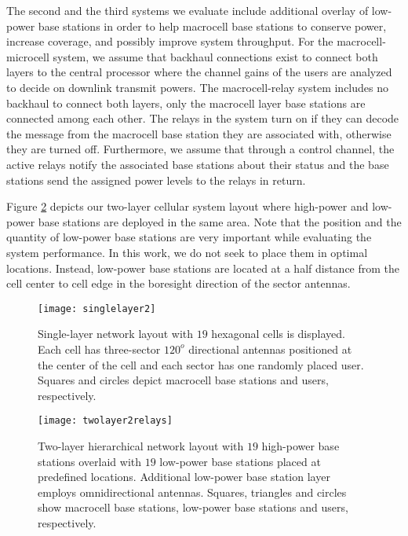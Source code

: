 \documentclass[conference,letterpaper,final,10pt]{IEEEtran}
\begin{document}
The second and the third systems we evaluate include additional overlay of low-power base stations in order to help macrocell base stations to conserve power, increase coverage, and possibly improve system throughput. For the macrocell-microcell system, we assume that backhaul connections exist to connect both layers to the central processor where the channel gains of the users are analyzed to decide on downlink transmit powers. The macrocell-relay system includes no backhaul to connect both layers, only the macrocell layer base stations are connected among each other. The relays in the system turn on if they can decode the message from the macrocell base station they are associated with, otherwise they are turned off. Furthermore, we assume that through a control channel, the active relays notify the associated base stations about their status and the base stations send the assigned power levels to the relays in return.

Figure \ref{twolayer_fig} depicts our two-layer cellular system layout where high-power and low-power base stations are deployed in the same area. Note that the position and the quantity of low-power base stations are very important while evaluating the system performance. In this work, we do not seek to place them in optimal locations. Instead, low-power base stations are located at a half distance from the cell center to cell edge in the boresight direction of the sector antennas.

\begin{figure}[tb!]\begin{center}
  \texttt{[image: singlelayer2]}\\ \caption{Single-layer network layout with $19$ hexagonal cells is displayed. Each cell has three-sector $120^o$  directional antennas positioned at the center of the cell and each sector has one randomly placed user. Squares and circles depict macrocell base stations and users, respectively.}\label{baseline_sector}\end{center}
\end{figure}

\begin{figure}[tb!]\begin{center}
  \texttt{[image: twolayer2relays]}\\\caption{Two-layer hierarchical network layout with $19$ high-power base stations overlaid with $19$ low-power base
    stations placed at predefined locations. Additional low-power base station layer employs omnidirectional antennas. Squares, triangles and circles show macrocell base stations, low-power base stations and users, respectively.}\label{twolayer_fig}\end{center}
\end{figure}
\end{document}
